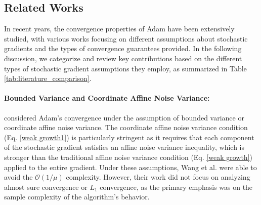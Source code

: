 \documentclass{article} %
\begin{document}
\begin{table}[t]
{%
}
\footnotesize{}
\end{table}


\subsection{Related Works}

In recent years, the convergence properties of Adam have been extensively studied, with various works focusing on different assumptions about stochastic gradients and the types of convergence guarantees provided. In the following discussion, we categorize and review key contributions based on the different types of stochastic gradient assumptions they employ, as summarized in Table \ref{tab:literature_comparison}.
\paragraph{Bounded Variance and Coordinate Affine Noise Variance:}
\cite{wang2024closing} considered Adam's convergence under the assumption of bounded variance or coordinate affine noise variance. The coordinate affine noise variance condition (Eq. \ref{weak growth1}) is particularly stringent as it requires that each component of the stochastic gradient satisfies an affine noise variance inequality, which is stronger than the traditional affine noise variance condition (Eq. \ref{weak growth}) applied to the entire gradient. Under these assumptions, Wang et al. were able to avoid the $\mathcal{O}(1/\mu)$ complexity. However, their work did not focus on analyzing almost sure convergence or $L_1$ convergence, as the primary emphasis was on the sample complexity of the algorithm's behavior.
\end{document}
